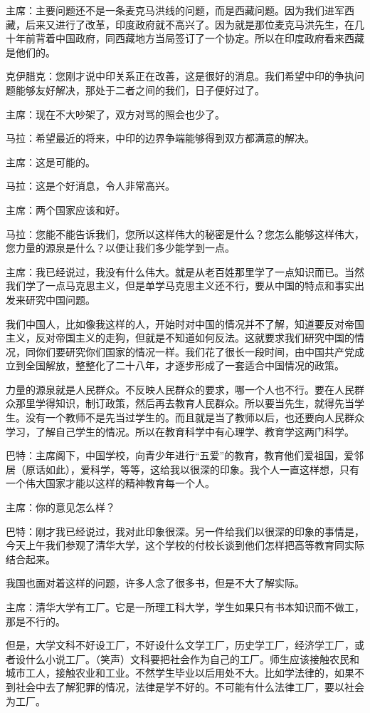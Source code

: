 主席：主要问题还不是一条麦克马洪线的问题，而是西藏问题。因为我们进军西藏，后来又进行了改革，印度政府就不高兴了。因为就是那位麦克马洪先生，在几十年前背着中国政府，同西藏地方当局签订了一个协定。所以在印度政府看来西藏是他们的。

克伊腊克：您刚才说中印关系正在改善，这是很好的消息。我们希望中印的争执问题能够友好解决，那处于二者之间的我们，日子便好过了。

主席：现在不大吵架了，双方对骂的照会也少了。

马拉：希望最近的将来，中印的边界争端能够得到双方都满意的解决。

主席：这是可能的。

马拉：这是个好消息，令人非常高兴。

主席：两个国家应该和好。

马拉：您能不能告诉我们，您所以这样伟大的秘密是什么？您怎么能够这样伟大，您力量的源泉是什么？以便让我们多少能学到一点。

主席：我已经说过，我没有什么伟大。就是从老百姓那里学了一点知识而已。当然我们学了一点马克思主义，但是单学马克思主义还不行，要从中国的特点和事实出发来研究中国问题。

我们中国人，比如像我这样的人，开始时对中国的情况并不了解，知道要反对帝国主义，反对帝国主义的走狗，但就是不知道如何反法。这就要求我们研究中国的情况，同你们要研究你们国家的情况一样。我们花了很长一段时间，由中国共产党成立到全国解放，整整化了二十八年，才逐步形成了一套适合中国情况的政策。

力量的源泉就是人民群众。不反映人民群众的要求，哪一个人也不行。要在人民群众那里学得知识，制订政策，然后再去教育人民群众。所以要当先生，就得先当学生。没有一个教师不是先当过学生的。而且就是当了教师以后，也还要向人民群众学习，了解自己学生的情况。所以在教育科学中有心理学、教育学这两门科学。

巴特：主席阁下，中国学校，向青少年进行“五爱”的教育，教育他们爱祖国，爱邻居（原话如此），爱科学，等等，这给我以很深的印象。我个人一直这样想，只有一个伟大国家才能以这样的精神教育每一个人。

主席：你的意见怎么样？

巴特：刚才我已经说过，我对此印象很深。另一件给我们以很深的印象的事情是，今天上午我们参观了清华大学，这个学校的付校长谈到他们怎样把高等教育同实际结合起来。

我国也面对着这样的问题，许多人念了很多书，但是不大了解实际。

主席：清华大学有工厂。它是一所理工科大学，学生如果只有书本知识而不做工，那是不行的。

但是，大学文科不好设工厂，不好设什么文学工厂，历史学工厂，经济学工厂，或者设什么小说工厂。（笑声）文科要把社会作为自己的工厂。师生应该接触农民和城市工人，接触农业和工业。不然学生毕业以后用处不大。比如学法律的，如果不到社会中去了解犯罪的情况，法律是学不好的。不可能有什么法律工厂，要以社会为工厂。

